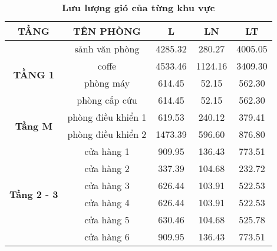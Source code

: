 \newpage 

\begin{table}[H]
	\centering
	\caption {\textbf{Lưu lượng gió của từng khu vực}}
	\begin{tabular}{|c|c|c|c|c|}
		\hline
		\textbf{TẦNG} & \textbf{TÊN PHÒNG} & \textbf{L } & \textbf{LN} & \textbf{LT} \bigstrut\\
		\hline
		\multirow{4}[8]{*}{\textbf{TẦNG 1}} & sảnh văn phòng & 4285.32 & 280.27 & 4005.05 \bigstrut\\
		\cline{2-5}      & coffe & 4533.46 & 1124.16 & 3409.30 \bigstrut\\
		\cline{2-5}      & phòng máy & 614.45 & 52.15 & 562.30 \bigstrut\\
		\cline{2-5}      & phòng cấp cứu & 614.45 & 52.15 & 562.30 \bigstrut\\
		\hline
		\multirow{2}[4]{*}{\textbf{Tầng M}} & phòng điều khiển 1 & 619.53 & 240.12 & 379.41 \bigstrut\\
		\cline{2-5}      & phòng điều khiển 2 & 1473.39 & 596.60 & 876.80 \bigstrut\\
		\hline
		\multirow{6}[12]{*}{\textbf{Tầng 2 - 3}} & cửa hàng 1 & 909.95 & 136.43 & 773.51 \bigstrut\\
		\cline{2-5}      & cửa hàng 2 & 337.39 & 104.68 & 232.72 \bigstrut\\
		\cline{2-5}      & cửa hàng 3 & 626.44 & 103.91 & 522.53 \bigstrut\\
		\cline{2-5}      & cửa hàng 4 & 626.44 & 103.91 & 522.53 \bigstrut\\
		\cline{2-5}      & cửa hàng 5 & 630.46 & 104.68 & 525.78 \bigstrut\\
		\cline{2-5}      & cửa hàng 6 & 909.95 & 136.43 & 773.51 \bigstrut\\
		\hline
	\end{tabular}%


\end{table}
